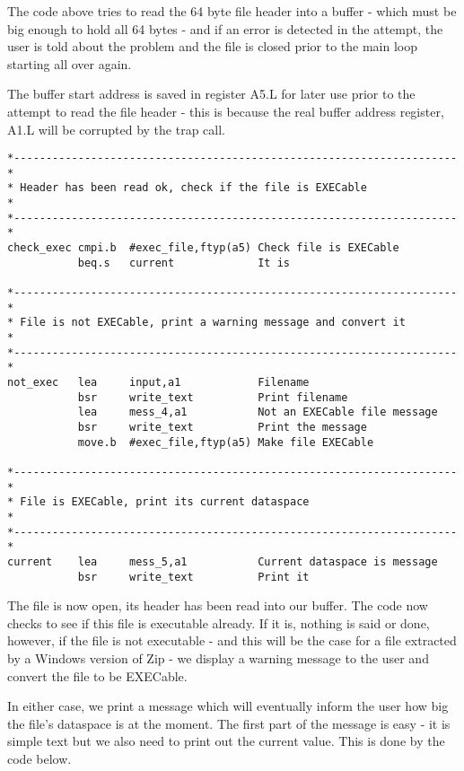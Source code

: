 The code above tries to read the 64 byte file header into a buffer -{}
    which must be big enough to hold all 64 bytes -{} and if an error is
    detected in the attempt, the user is told about the problem and the file
    is closed prior to the main loop starting all over again.

The buffer start address is saved in register A5.L for later use
    prior to the attempt to read the file header -{} this is because the real
    buffer address register, A1.L will be corrupted by the trap call.

\begin{lstlisting}[firstnumber=last,caption={Dataspace Program - Part 5 - Exec Check}]
*---------------------------------------------------------------------*
* Header has been read ok, check if the file is EXECable              *
*---------------------------------------------------------------------*
check_exec cmpi.b  #exec_file,ftyp(a5) Check file is EXECable
           beq.s   current             It is

*---------------------------------------------------------------------*
* File is not EXECable, print a warning message and convert it        *
*---------------------------------------------------------------------*
not_exec   lea     input,a1            Filename
           bsr     write_text          Print filename
           lea     mess_4,a1           Not an EXECable file message
           bsr     write_text          Print the message
           move.b  #exec_file,ftyp(a5) Make file EXECable

*---------------------------------------------------------------------*
* File is EXECable, print its current dataspace                       *
*---------------------------------------------------------------------*
current    lea     mess_5,a1           Current dataspace is message
           bsr     write_text          Print it
\end{lstlisting}

The file is now open, its header has been read into our buffer. The
    code now checks to see if this file is executable already. If it is,
    nothing is said or done, however, if the file is not executable -{} and this
    will be the case for a file extracted by a Windows version of Zip -{} we
    display a warning message to the user and convert the file to be
    EXECable.

In either case, we print a message which will eventually inform the
    user how big the file's dataspace is at the moment. The first part of the
    message is easy -{} it is simple text but we also need to print out the
    current value. This is done by the code below.

